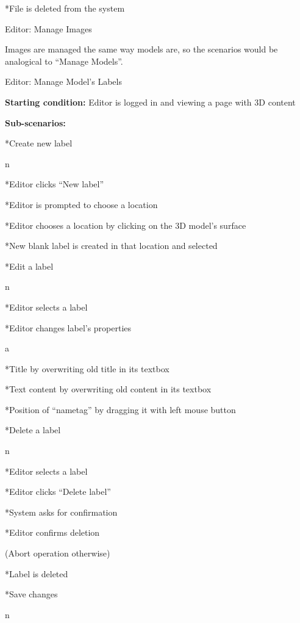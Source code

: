 *File is deleted from the system

\enditems

\enditems

\secc Editor: Manage Images

Images are managed the same way models are, so the scenarios would be analogical to “Manage Models”.

\secc Editor: Manage Model's Labels

{\bf Starting condition:} Editor is logged in and viewing a page with 3D content

{\bf Sub-scenarios:}

\begitems

*Create new label

\begitems \style n

*Editor clicks “New label”

*Editor is prompted to choose a location

*Editor chooses a location by clicking on the 3D model’s surface

*New blank label is created in that location and selected

\enditems

*Edit a label

\begitems \style n

*Editor selects a label

*Editor changes label’s properties

\begitems \style a

*Title by overwriting old title in its textbox

*Text content by overwriting old content in its textbox

*Position of “nametag” by dragging it with left mouse button

\enditems

\enditems

*Delete a label

\begitems \style n

*Editor selects a label

*Editor clicks “Delete label”

*System asks for confirmation

*Editor confirms deletion

(Abort operation otherwise)

*Label is deleted

\enditems

*Save changes

\begitems \style n

